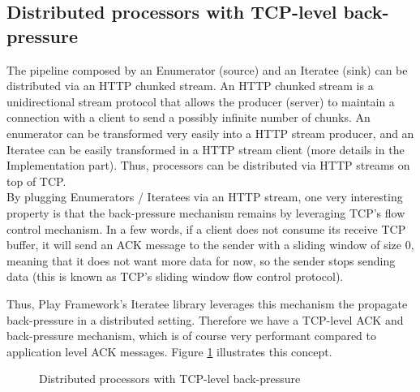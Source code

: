 \subsection{Distributed processors with TCP-level back-pressure}

The pipeline composed by an Enumerator (source) and an Iteratee (sink) can be distributed via an HTTP chunked stream. An HTTP chunked stream is a unidirectional stream protocol that allows the producer (server) to maintain a connection with a client to send a possibly infinite number of chunks. An enumerator can be transformed very easily into a HTTP stream producer, and an Iteratee can be easily transformed in a HTTP stream client (more details in the Implementation part). Thus, processors can be distributed via HTTP streams on top of TCP.
\\

By plugging Enumerators / Iteratees via an HTTP stream, one very interesting property is that the back-pressure mechanism remains by leveraging TCP's flow control mechanism. In a few words, if a client does not consume its receive TCP buffer, it will send an ACK message to the sender with a sliding window of size 0, meaning that it does not want more data for now, so the sender stops sending data (this is known as TCP's sliding window flow control protocol).

Thus, Play Framework's Iteratee library leverages this mechanism the propagate back-pressure in a distributed setting. Therefore we have a TCP-level ACK and back-pressure mechanism, which is of course very performant compared to application level ACK messages. Figure \ref{fig:tcpbackpressure} illustrates this concept.

\begin{figure}[h]
  \begin{center} 
    \caption{Distributed processors with TCP-level back-pressure}
    \label{fig:tcpbackpressure}
  \end{center}
\end{figure}


